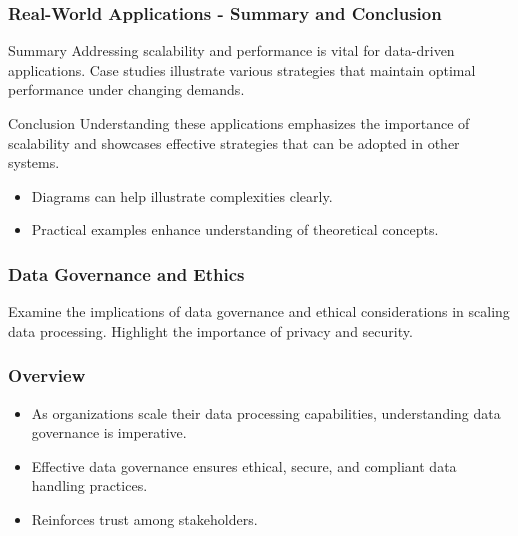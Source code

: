 \documentclass[aspectratio=169]{beamer}
\begin{document}
\begin{frame}[fragile]
    \frametitle{Real-World Applications - Summary and Conclusion}
    \begin{block}{Summary}
        Addressing scalability and performance is vital for data-driven applications. Case studies illustrate various strategies that maintain optimal performance under changing demands.
    \end{block}

    \begin{block}{Conclusion}
        Understanding these applications emphasizes the importance of scalability and showcases effective strategies that can be adopted in other systems.
    \end{block}
    
    \begin{itemize}
        \item Diagrams can help illustrate complexities clearly.
        \item Practical examples enhance understanding of theoretical concepts.
    \end{itemize}
\end{frame}

\begin{frame}[fragile]
    \frametitle{Data Governance and Ethics}
    Examine the implications of data governance and ethical considerations in scaling data processing. Highlight the importance of privacy and security.
\end{frame}

\begin{frame}[fragile]
    \frametitle{Overview}
    \begin{itemize}
        \item As organizations scale their data processing capabilities, understanding data governance is imperative.
        \item Effective data governance ensures ethical, secure, and compliant data handling practices.
        \item Reinforces trust among stakeholders.
    \end{itemize}
\end{frame}
\end{document}
